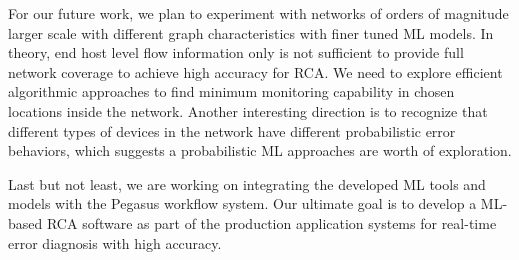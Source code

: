 For our future work, we plan to experiment with networks of orders of magnitude larger scale with different graph characteristics with finer tuned ML models. In theory, end host level flow information only is not sufficient to provide full network coverage to achieve high accuracy for RCA. We need to explore efficient algorithmic approaches to find minimum monitoring capability in chosen locations inside the network. Another interesting direction is to recognize that different types of devices in the network have different probabilistic error behaviors, which suggests a probabilistic ML approaches are worth of exploration.

Last but not least, we are working on integrating the developed ML tools and models with the Pegasus workflow system. Our ultimate goal is to develop a ML-based RCA software as part of the production application systems for real-time error diagnosis with high accuracy.

